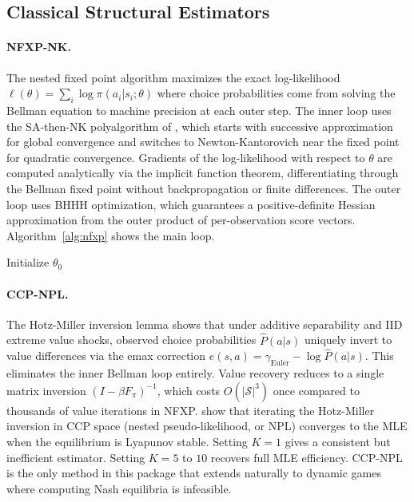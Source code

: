 \subsection{Classical Structural Estimators}

\paragraph{NFXP-NK.}
The nested fixed point algorithm maximizes the exact log-likelihood $\ell(\theta) = \sum_i \log \pi(a_i | s_i; \theta)$ where choice probabilities come from solving the Bellman equation to machine precision at each outer step.
The inner loop uses the SA-then-NK polyalgorithm of \citet{iskhakov2016}, which starts with successive approximation for global convergence and switches to Newton-Kantorovich near the fixed point for quadratic convergence.
Gradients of the log-likelihood with respect to $\theta$ are computed analytically via the implicit function theorem, differentiating through the Bellman fixed point without backpropagation or finite differences.
The outer loop uses BHHH optimization, which guarantees a positive-definite Hessian approximation from the outer product of per-observation score vectors.
Algorithm~\ref{alg:nfxp} shows the main loop.

\begin{algorithm}[H]
\DontPrintSemicolon
\caption{NFXP-NK \citep{rust1987, iskhakov2016}}
\label{alg:nfxp}
Initialize $\theta_0$\;
\end{algorithm}

\paragraph{CCP-NPL.}
The Hotz-Miller inversion lemma \citep{hotzMiller1993} shows that under additive separability and IID extreme value shocks, observed choice probabilities $\hat P(a|s)$ uniquely invert to value differences via the emax correction $e(s,a) = \gamma_{\text{Euler}} - \log \hat P(a|s)$.
This eliminates the inner Bellman loop entirely.
Value recovery reduces to a single matrix inversion $(I - \beta F_\pi)^{-1}$, which costs $O(|\mathcal{S}|^3)$ once compared to thousands of value iterations in NFXP.
\citet{aguirregabiriaMira2002} show that iterating the Hotz-Miller inversion in CCP space (nested pseudo-likelihood, or NPL) converges to the MLE when the equilibrium is Lyapunov stable.
Setting $K=1$ gives a consistent but inefficient estimator.
Setting $K=5$ to $10$ recovers full MLE efficiency.
CCP-NPL is the only method in this package that extends naturally to dynamic games where computing Nash equilibria is infeasible.

